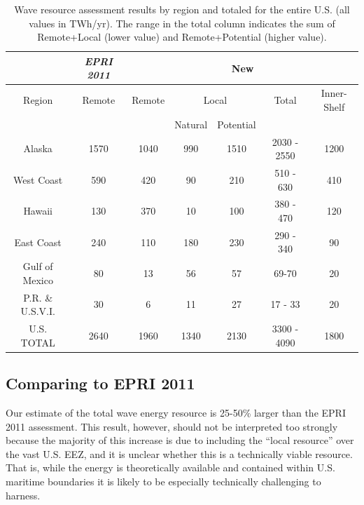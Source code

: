 \begin{table}[ht]
  \centering
  \begin{tabular}{|c|c|c|c|c|c|c|}
    \cline{2-7}
    \multicolumn{1}{c|}{} & {\it EPRI 2011} & \multicolumn{5}{c|}{New} \\
    \hline
    Region & Remote  & Remote & \multicolumn{2}{c|}{Local} & Total & Inner-Shelf\\
    & & & Natural & Potential & & \\
    \hline
    Alaska & 1570 & 1040 & 990 & 1510 & 2030 - 2550 & 1200 \\
    West Coast & 590 & 420 & 90 & 210 & 510 - 630 & 410 \\
    Hawaii & 130 & 370 & 10 & 100 & 380 - 470 & 120 \\
    East Coast & 240 & 110 & 180 & 230 & 290 - 340 & 90 \\
    Gulf of Mexico & 80 & 13 & 56 & 57 & 69-70 & 20 \\
    P.R. \& U.S.V.I. & 30 & 6 & 11 & 27 & 17 - 33 & 20 \\
    \hline \hline
U.S. TOTAL & 2640 & 1960 & 1340 & 2130 & 3300 - 4090 & 1800 \\
\hline
  \end{tabular}
  \caption{Wave resource assessment results by region and totaled for the entire U.S. (all values in TWh/yr). The range in the total column indicates the sum of Remote+Local (lower value) and Remote+Potential (higher value). }
  \label{table:totals}
\end{table}

\subsection{Comparing to EPRI 2011}

Our estimate of the total wave energy resource is 25-50\% larger than the EPRI 2011 assessment. This result, however, should not be interpreted too strongly because the majority of this increase is due to including the ``local resource'' over the vast U.S. EEZ, and it is unclear whether this is a technically viable resource. That is, while the energy is theoretically available and contained within U.S. maritime boundaries it is likely to be especially technically challenging to harness.

